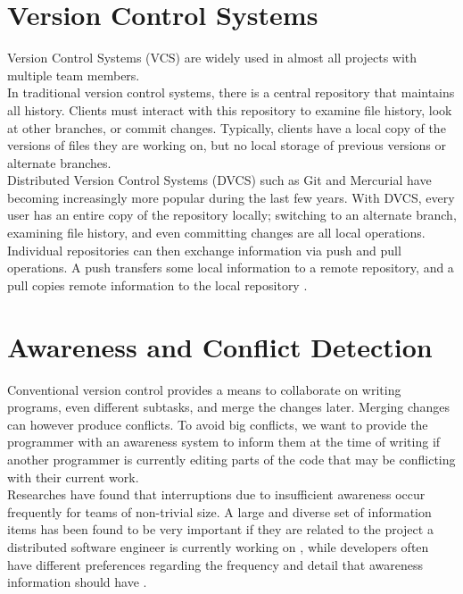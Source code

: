 \section{Version Control Systems}


Version Control Systems (VCS) are widely used in almost all projects with multiple team members. \\

In traditional version control systems, there is a central repository that maintains all history. Clients must interact with this repository to examine file history, look at other branches, or commit changes. Typically, clients have a local copy of the versions of files they are working on, but no local storage of previous versions or alternate branches. \\

Distributed Version Control Systems (DVCS) such as Git and Mercurial have becoming increasingly more popular during the last few years. With DVCS, every user has an entire copy of the repository locally; switching to an alternate branch, examining file history, and even committing changes are all local operations. Individual repositories can then exchange information via push and pull operations. A push transfers some local information to a remote repository, and a pull copies remote information to the local repository \cite{ref17}.




\section{Awareness and Conflict Detection}





Conventional version control provides a means to collaborate on writing programs, even different subtasks, and merge the changes later. Merging changes can however produce conflicts. To avoid big conflicts, we want to provide the programmer with an awareness system to inform them at the time of writing if another programmer is currently editing parts of the code that may be conflicting with their current work. \\

Researches have found that interruptions due to insufficient awareness occur frequently for teams of non-trivial size. A large and diverse set of information items has been found to be very important if they are related to the project a distributed software engineer is currently working on \cite{ref21}, while developers often have different preferences regarding the frequency and detail that awareness information should have \cite{ref3}. 




